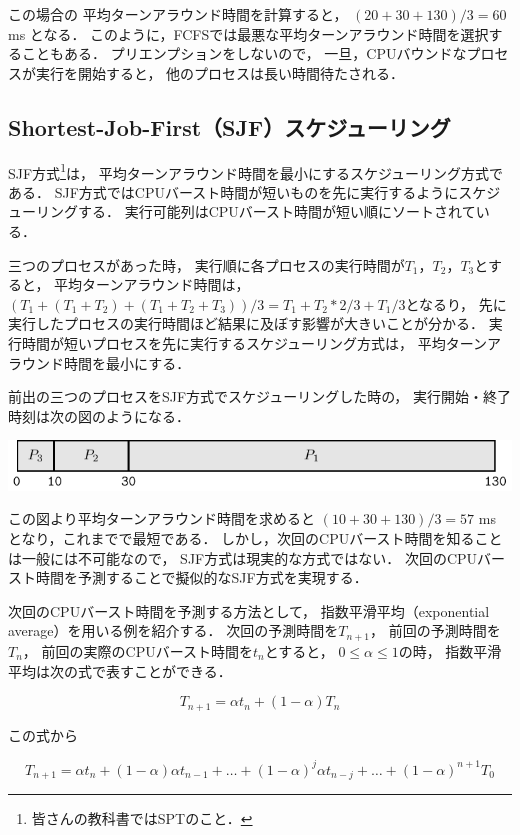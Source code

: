 この場合の
平均ターンアラウンド時間を計算すると，
$(20+30+130) / 3 = 60$ ms となる．
このように，FCFSでは最悪な平均ターンアラウンド時間を選択することもある．
プリエンプションをしないので，
一旦，CPUバウンドなプロセスが実行を開始すると，
他のプロセスは長い時間待たされる．

\subsection{Shortest-Job-First（SJF）スケジューリング}
SJF方式\footnote{皆さんの教科書ではSPTのこと．}は，
平均ターンアラウンド時間を最小にするスケジューリング方式である．
SJF方式ではCPUバースト時間が短いものを先に実行するようにスケジューリングする．
実行可能列はCPUバースト時間が短い順にソートされている．

三つのプロセスがあった時，
実行順に各プロセスの実行時間が$T_1$，$T_2$，$T_3$とすると，
平均ターンアラウンド時間は，
$(T_1+(T_1+T_2)+(T_1+T_2+T_3))/3=T_1+T_2*2/3+T_1/3$となるり，
先に実行したプロセスの実行時間ほど結果に及ぼす影響が大きいことが分かる．
実行時間が短いプロセスを先に実行するスケジューリング方式は，
平均ターンアラウンド時間を最小にする．

前出の三つのプロセスをSJF方式でスケジューリングした時の，
実行開始・終了時刻は次の図のようになる．

\begin{center}
\includegraphics[scale=1.0]{Tbl/sjf1.pdf}
\end{center}

この図より平均ターンアラウンド時間を求めると
$(10+30+130)/3 = 57$ ms となり，これまでで最短である．
しかし，次回のCPUバースト時間を知ることは一般には不可能なので，
SJF方式は現実的な方式ではない．
次回のCPUバースト時間を予測することで擬似的なSJF方式を実現する．

次回のCPUバースト時間を予測する方法として，
指数平滑平均（exponential average）を用いる例を紹介する．
次回の予測時間を$T_{n+1}$，
前回の予測時間を$T_{n}$，
前回の実際のCPUバースト時間を$t_{n}$とすると，
$0 \le \alpha \le 1$の時，
指数平滑平均は次の式で表すことができる．

\[T_{n+1} = \alpha t_n + ( 1 - \alpha ) T_n\]

この式から

\[T_{n+1} = \alpha t_n + ( 1 - \alpha ) \alpha t_{n-1} + \dots +
 ( 1 - \alpha )^j \alpha t_{n-j} + \dots + (1 - \alpha )^{n+1} T_0 \]

